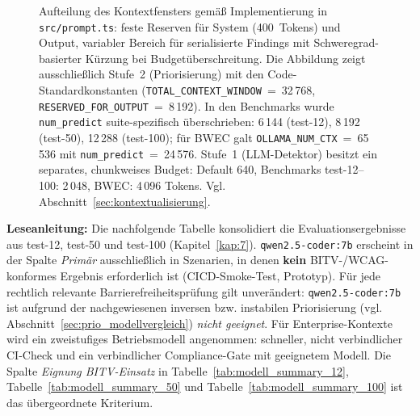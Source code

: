 \begin{figure}[htbp]
\caption[Aufteilung des Token-Budgets]{Aufteilung des Kontextfensters gemäß Implementierung in \texttt{src/prompt.ts}: feste Reserven für System (400~Tokens) und Output, variabler Bereich für serialisierte Findings mit Schweregrad-basierter Kürzung bei Budgetüberschreitung. Die Abbildung zeigt ausschließlich Stufe~2 (Priorisierung) mit den Code-Standardkonstanten (\texttt{TOTAL\_CONTEXT\_WINDOW}~=~32\,768, \texttt{RESERVED\_FOR\_OUTPUT}~=~8\,192). In den Benchmarks wurde \texttt{num\_predict} suite-spezifisch überschrieben: 6\,144 (test-12), 8\,192 (test-50), 12\,288 (test-100); für \ac{BWEC} galt \texttt{OLLAMA\_NUM\_CTX}~=~65\,536 mit \texttt{num\_predict}~=~24\,576. Stufe~1 (\ac{LLM}-Detektor) besitzt ein separates, chunkweises Budget: Default 640, Benchmarks test-12--100: 2\,048, \ac{BWEC}: 4\,096 Tokens. Vgl. Abschnitt~\ref{sec:kontextualisierung}.}
\label{fig:tokenbudget}
\end{figure}


\clearpage
{}\label{app:einsatzempfehlungen}

\textbf{Leseanleitung:} Die nachfolgende Tabelle konsolidiert die Evaluationsergebnisse aus test-12, test-50 und test-100 (Kapitel~\ref{kap:7}). \texttt{qwen2.5-coder:7b} erscheint in der Spalte \textit{Primär} ausschließlich in Szenarien, in denen \textbf{kein} \ac{BITV}-/\ac{WCAG}-konformes Ergebnis erforderlich ist (\ac{CICD}-Smoke-Test, Prototyp). Für jede rechtlich relevante Barrierefreiheitsprüfung gilt unverändert: \texttt{qwen2.5-coder:7b} ist aufgrund der nachgewiesenen inversen bzw. instabilen Priorisierung (vgl. Abschnitt~\ref{sec:prio_modellvergleich}) \textit{nicht geeignet}. Für Enterprise-Kontexte wird ein zweistufiges Betriebsmodell angenommen: schneller, nicht verbindlicher \ac{CI}-Check und ein verbindlicher Compliance-Gate mit geeignetem Modell. Die Spalte \textit{Eignung \ac{BITV}-Einsatz} in Tabelle~\ref{tab:modell_summary_12}, Tabelle~\ref{tab:modell_summary_50} und Tabelle~\ref{tab:modell_summary_100} ist das übergeordnete Kriterium.

